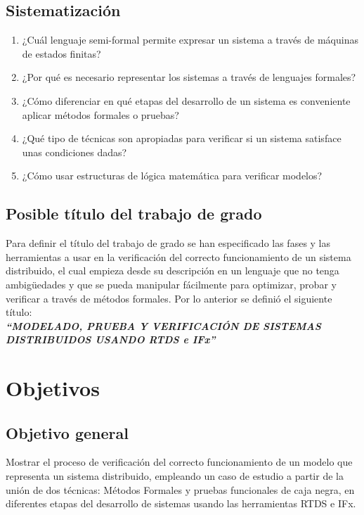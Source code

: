 \subsection{Sistematizaci\'on}

\begin{enumerate}

\item ¿Cu\'al lenguaje semi-formal permite expresar un sistema a trav\'es de 
m\'aquinas de estados finitas?
 \item ¿Por qu\'e es necesario representar los sistemas a trav\'es de lenguajes 
formales?
\item ¿C\'omo diferenciar en qu\'e etapas del desarrollo de un sistema es 
conveniente aplicar m\'etodos formales o pruebas?
\item ¿Qu\'e tipo de t\'ecnicas son apropiadas para verificar si un sistema 
satisface unas condiciones dadas?
\item ¿C\'omo usar estructuras de l\'ogica matem\'atica para verificar 
modelos?
\end{enumerate}

\subsection{Posible t\'itulo del trabajo de grado}
Para definir el t\'itulo del trabajo de grado se han especificado las fases y 
las herramientas a usar en la verificaci\'on del correcto funcionamiento de un 
sistema distribuido, el cual empieza desde su descripci\'on en un lenguaje que 
no tenga ambig\"uedades y que se pueda manipular f\'acilmente para optimizar, 
probar y verificar a trav\'es de m\'etodos formales. Por lo anterior se 
defini\'o el siguiente t\'itulo:
\\

\textbf{\textit{``MODELADO, PRUEBA Y VERIFICACI\'ON DE SISTEMAS DISTRIBUIDOS 
USANDO RTDS e IFx''}}



\section{Objetivos}

\subsection{Objetivo general}

Mostrar el proceso de verificaci\'on del correcto funcionamiento de un modelo 
que representa un sistema distribuido, empleando un caso de estudio a partir de 
la uni\'on de dos t\'ecnicas: M\'etodos Formales y pruebas funcionales de 
caja negra, en diferentes etapas del desarrollo de sistemas usando las 
herramientas RTDS e IFx.


